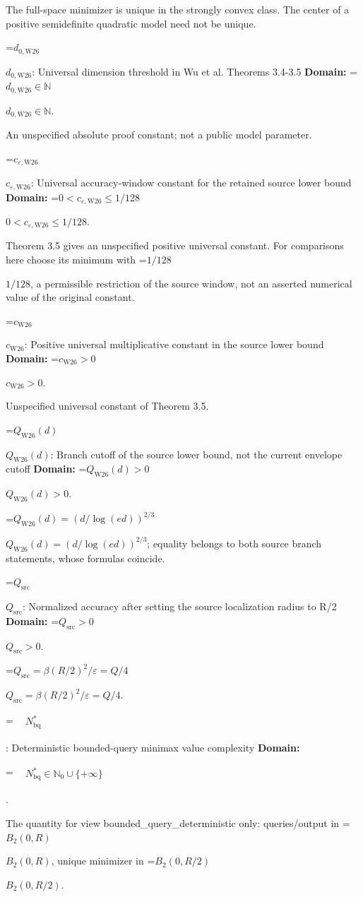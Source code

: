 \documentclass[10pt,a4paper]{article}
\newcommand{\AtlasMath}[1]{\par\begingroup\centering\setbox0=\hbox{$\displaystyle #1$}\ifdim\wd0>1.4\linewidth\typeout{ATLAS WIDE FORMULA: \the\wd0}\fi\ifdim\wd0>\linewidth\resizebox{\linewidth}{!}{\box0}\else\box0\fi\par\endgroup}
\newcommand{\AtlasInlineMath}[1]{\begingroup\setbox0=\hbox{$#1$}\ifdim\wd0>.4\linewidth\endgroup\AtlasMath{#1}\else\endgroup$#1$\fi}
\begin{document}
The full-space minimizer is unique in the strongly convex class. The center of a positive semidefinite quadratic model need not be unique.

\AtlasInlineMath{d_{0,\mathrm{W26}}}: Universal dimension threshold in Wu et al. Theorems 3.4-3.5 \textbf{Domain:} \AtlasInlineMath{d_{0,\mathrm{W26}}\in\mathbb N}.

An unspecified absolute proof constant; not a public model parameter.

\AtlasInlineMath{c_{\varepsilon,\mathrm{W26}}}: Universal accuracy-window constant for the retained source lower bound \textbf{Domain:} \AtlasInlineMath{0<c_{\varepsilon,\mathrm{W26}}\le1/128}.

Theorem 3.5 gives an unspecified positive universal constant. For comparisons here choose its minimum with \AtlasInlineMath{1/128}, a permissible restriction of the source window, not an asserted numerical value of the original constant.

\AtlasInlineMath{c_{\mathrm{W26}}}: Positive universal multiplicative constant in the source lower bound \textbf{Domain:} \AtlasInlineMath{c_{\mathrm{W26}}>0}.

Unspecified universal constant of Theorem 3.5.

\AtlasInlineMath{Q_{\mathrm{W26}}(d)}: Branch cutoff of the source lower bound, not the current envelope cutoff \textbf{Domain:} \AtlasInlineMath{Q_{\mathrm{W26}}(d)>0}.

\AtlasInlineMath{Q_{\mathrm{W26}}(d)=(d/\log(ed))^{2/3}}; equality belongs to both source branch statements, whose formulas coincide.

\AtlasInlineMath{Q_{\mathrm{src}}}: Normalized accuracy after setting the source localization radius to R/2 \textbf{Domain:} \AtlasInlineMath{Q_{\mathrm{src}}>0}.

\AtlasInlineMath{Q_{\mathrm{src}}=\beta(R/2)^2/\varepsilon=Q/4}.




\AtlasMath{\begin{aligned}&N_{\mathrm{bq}}^*\end{aligned}}


: Deterministic bounded-query minimax value complexity \textbf{Domain:} 


\AtlasMath{\begin{aligned}&N_{\mathrm{bq}}^*\in\mathbb N_0\cup\{+\infty\}\end{aligned}}


.

The quantity for view bounded\_query\_deterministic only: queries/output in \AtlasInlineMath{B_2(0,R)}, unique minimizer in \AtlasInlineMath{B_2(0,R/2)}.
\end{document}
